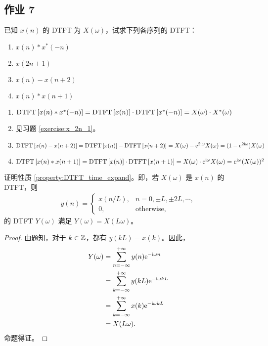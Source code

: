 \subsection{作业 7}

\begin{homework}
    已知 $x(n)$ 的 DTFT 为 $X(\omega)$，试求下列各序列的 DTFT：
    \begin{enumerate}[label=(\arabic*)]
        \item $x(n) * x^*(-n)$
        \item $x(2n + 1)$
        \item $x(n) - x(n + 2)$
        \item $x(n) * x(n + 1)$
    \end{enumerate}
\end{homework}

\begin{solution}
    \begin{enumerate}[label=(\arabic*)]
        \item $\mathrm{DTFT}\left[x(n) * x^*(-n)\right] = \mathrm{DTFT}\left[x(n)\right] \cdot \mathrm{DTFT}\left[x^*(-n)\right]
            = X(\omega) \cdot X^*(\omega)$
        \item 见习题 \ref{exercise:x_2n_1}。
        \item $\mathrm{DTFT}\left[x(n) - x(n + 2)\right] = \mathrm{DTFT}\left[x(n)\right] - \mathrm{DTFT}\left[x(n + 2)\right]
            = X(\omega) - \mathrm{e}^{2\mathrm{i}\omega}X(\omega)
            = (1 - \mathrm{e}^{2\mathrm{i}\omega})X(\omega)$
        \item $\mathrm{DTFT}\left[x(n) * x(n + 1)\right] = \mathrm{DTFT}\left[x(n)\right] \cdot \mathrm{DTFT}\left[x(n + 1)\right]
            = X(\omega) \cdot \mathrm{e}^{\mathrm{i}\omega}X(\omega)
            = \mathrm{e}^{\mathrm{i}\omega}(X(\omega))^2$
    \end{enumerate}
\end{solution}

\begin{homework}
    证明性质 \ref{property:DTFT_time_expand}。即，若 $X(\omega)$ 是 $x(n)$ 的 DTFT，则
    \begin{align*}
        y(n) = \begin{cases}
            x(n / L), & n = 0, \pm L, \pm 2L, \cdots, \\
            0, & \text{otherwise},
        \end{cases}
    \end{align*}
    的 DTFT $Y(\omega)$ 满足 $Y(\omega) = X(L \omega)$。
\end{homework}

\begin{proof}
    由题知，对于 $k \in \mathbb{Z}$，都有 $y(kL) = x(k)$。因此，
    \begin{align*}
        Y(\omega) & = \sum_{n = -\infty}^{+\infty}y(n)\mathrm{e}^{-\mathrm{i}\omega n} \\
        & = \sum_{k = -\infty}^{+\infty}y(k L)\mathrm{e}^{-\mathrm{i}\omega kL} \\
        & = \sum_{k = -\infty}^{+\infty}x(k)\mathrm{e}^{-\mathrm{i}\omega kL} \\
        & = X(L\omega).
    \end{align*}
    命题得证。
\end{proof}

